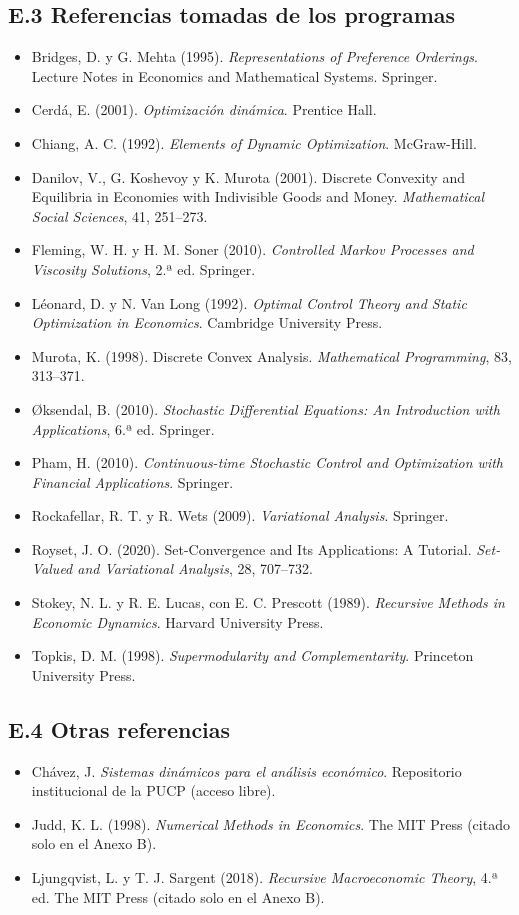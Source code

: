 \documentclass[11pt,a4paper]{article}
\begin{document}
\subsection*{E.3 Referencias tomadas de los programas}
{\small
\begin{itemize}[leftmargin=1.4em,itemsep=1pt,label={}]
\item Bridges, D. y G. Mehta (1995). \emph{Representations of Preference Orderings}. Lecture Notes in Economics and Mathematical Systems. Springer.
\item Cerdá, E. (2001). \emph{Optimización dinámica}. Prentice Hall.
\item Chiang, A. C. (1992). \emph{Elements of Dynamic Optimization}. McGraw-Hill.
\item Danilov, V., G. Koshevoy y K. Murota (2001). Discrete Convexity and Equilibria in Economies with Indivisible Goods and Money. \emph{Mathematical Social Sciences}, 41, 251--273.
\item Fleming, W. H. y H. M. Soner (2010). \emph{Controlled Markov Processes and Viscosity Solutions}, 2.ª ed. Springer.
\item Léonard, D. y N. Van Long (1992). \emph{Optimal Control Theory and Static Optimization in Economics}. Cambridge University Press.
\item Murota, K. (1998). Discrete Convex Analysis. \emph{Mathematical Programming}, 83, 313--371.
\item Øksendal, B. (2010). \emph{Stochastic Differential Equations: An Introduction with Applications}, 6.ª ed. Springer.
\item Pham, H. (2010). \emph{Continuous-time Stochastic Control and Optimization with Financial Applications}. Springer.
\item Rockafellar, R. T. y R. Wets (2009). \emph{Variational Analysis}. Springer.
\item Royset, J. O. (2020). Set-Convergence and Its Applications: A Tutorial. \emph{Set-Valued and Variational Analysis}, 28, 707--732.
\item Stokey, N. L. y R. E. Lucas, con E. C. Prescott (1989). \emph{Recursive Methods in Economic Dynamics}. Harvard University Press.
\item Topkis, D. M. (1998). \emph{Supermodularity and Complementarity}. Princeton University Press.
\end{itemize}
}

\subsection*{E.4 Otras referencias}
{\small
\begin{itemize}[leftmargin=1.4em,itemsep=1pt,label={}]
\item Chávez, J. \emph{Sistemas dinámicos para el análisis económico}. Repositorio institucional de la PUCP (acceso libre).
\item Judd, K. L. (1998). \emph{Numerical Methods in Economics}. The MIT Press (citado solo en el Anexo B).
\item Ljungqvist, L. y T. J. Sargent (2018). \emph{Recursive Macroeconomic Theory}, 4.ª ed. The MIT Press (citado solo en el Anexo B).
\end{itemize}
}
\end{document}
